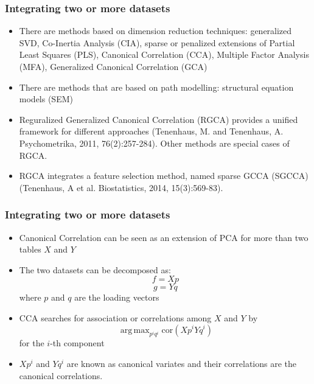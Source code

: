 \documentclass[10pt,xcolor=dvipsnames]{beamer}\usepackage[]{graphicx}\usepackage[]{color}
\DeclareMathOperator{\argmax}{arg\,max}
\begin{document}
\begin{frame}[plain]\frametitle{Integrating two or more datasets}

\begin{itemize}
\item There are methods based on dimension reduction techniques: generalized SVD, Co-Inertia Analysis (CIA), sparse or penalized extensions of Partial Least Squares (PLS),
Canonical Correlation (CCA), Multiple Factor Analysis (MFA), Generalized Canonical Correlation (GCA)
\pause
\item There are methods that are based on path modelling: structural equation models (SEM)
\pause
\item Reguralized Generalized Canonical Correlation (RGCA) provides a unified framework for different approaches (Tenenhaus, M. and Tenenhaus, A. Psychometrika, 2011, 76(2):257-284). Other methods are special cases of RGCA.
\pause
\item RGCA integrates a feature selection method, named sparse GCCA (SGCCA) (Tenenhaus, A et al. Biostatistics, 2014, 15(3):569-83).
\end{itemize}

\end{frame}




\begin{frame}[plain]\frametitle{Integrating two or more datasets}

\begin{itemize}
\item Canonical Correlation can be seen as an extension of PCA for more than two tables $X$ and $Y$
\item The two datasets can be decomposed as:
$$ f =Xp $$ $$ g =Yq $$
where $p$ and $q$ are the loading vectors
\item CCA searches for association or correlations among $X$ and $Y$ by
$$ \argmax_{p^i q^i} \text{cor}(Xp^i Yq^i)$$
for the $i$-th component
\item $Xp^i$ and $Yq^i$ are known as canonical variates and their correlations are the canonical correlations.
\end{itemize}

\end{frame}
\end{document}
